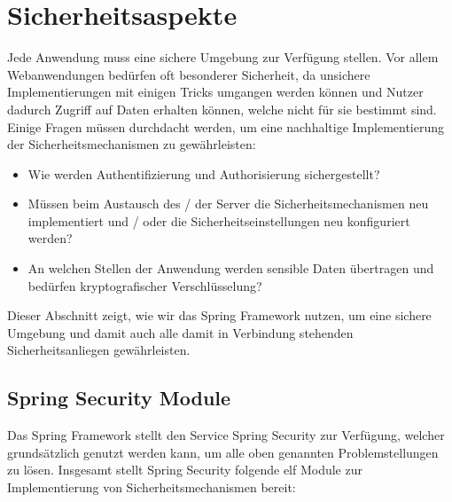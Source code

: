\section{Sicherheitsaspekte}

Jede Anwendung muss eine sichere Umgebung zur Verfügung stellen. Vor allem 
Webanwendungen bedürfen oft besonderer Sicherheit, da unsichere
Implementierungen mit einigen Tricks umgangen werden können und Nutzer dadurch 
Zugriff auf Daten erhalten können, welche nicht für sie bestimmt sind. Einige 
Fragen müssen durchdacht werden, um eine nachhaltige Implementierung der 
Sicherheitsmechanismen zu gewährleisten:

\begin{itemize}
\item Wie werden Authentifizierung und Authorisierung sichergestellt?
\item Müssen beim Austausch des / der Server die Sicherheitsmechanismen neu implementiert und / oder die
	  Sicherheitseinstellungen neu konfiguriert werden?
\item An welchen Stellen der Anwendung werden sensible Daten übertragen und bedürfen kryptografischer 	      
      Verschlüsselung?
\end{itemize} 

Dieser Abschnitt zeigt, wie wir das Spring Framework nutzen, um eine sichere 
Umgebung und damit auch alle damit in Verbindung stehenden Sicherheitsanliegen 
gewährleisten.

\subsection{Spring Security Module}
\label{subsec:spring_security}

Das Spring Framework stellt den Service Spring Security zur Verfügung, welcher grundsätzlich genutzt 
werden kann, um alle oben genannten Problemstellungen zu lösen. Insgesamt stellt Spring Security folgende 
elf Module zur Implementierung von Sicherheitsmechanismen bereit:

